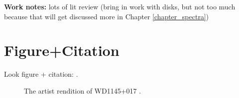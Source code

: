 \textbf{Work notes:} lots of lit review (bring in work with disks, but not too much because that will get discussed more in Chapter \ref{chapter_spectra})


\section{Figure+Citation}

Look figure + citation: \citep[e.g.,][see Fig. \ref{PrettyPic}]{Vanderburg2015}. 

\begin{figure}
\centering
{}
\caption{The artist rendition of WD1145+017 \citep[from][]{Vanderburg2015}.}
\label{PrettyPic}
\end{figure}

